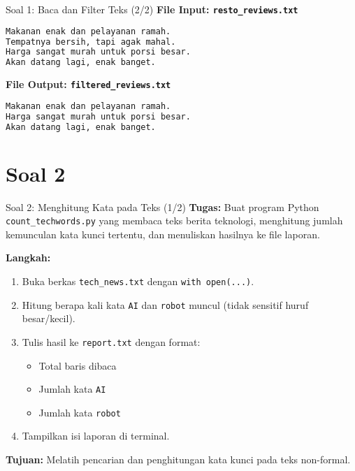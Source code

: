 \documentclass[aspectratio=169, table]{beamer}
\begin{document}
\begin{frame}[fragile]{Soal 1: Baca dan Filter Teks (2/2)}
\vspace{15pt}
\textbf{File Input: \texttt{resto\_reviews.txt}}
\begin{lstlisting}[language=bash,basicstyle=\ttfamily\small]
Makanan enak dan pelayanan ramah.
Tempatnya bersih, tapi agak mahal.
Harga sangat murah untuk porsi besar.
Akan datang lagi, enak banget.
\end{lstlisting}

\textbf{File Output: \texttt{filtered\_reviews.txt}}
\begin{lstlisting}[language=bash,basicstyle=\ttfamily\small]
Makanan enak dan pelayanan ramah.
Harga sangat murah untuk porsi besar.
Akan datang lagi, enak banget.
\end{lstlisting}
\end{frame}

\section{Soal 2}
\begin{frame}[fragile]{Soal 2: Menghitung Kata pada Teks (1/2)}
\vspace{15pt}
\textbf{Tugas:}  
Buat program Python \texttt{count\_techwords.py} yang membaca teks berita teknologi, menghitung jumlah kemunculan kata kunci tertentu, dan menuliskan hasilnya ke file laporan.

\textbf{Langkah:}
\begin{enumerate}
  \item Buka berkas \texttt{tech\_news.txt} dengan \texttt{with open(...)}.
  \item Hitung berapa kali kata \texttt{AI} dan \texttt{robot} muncul  
        (tidak sensitif huruf besar/kecil).
  \item Tulis hasil ke \texttt{report.txt} dengan format:
        \begin{itemize}
          \item Total baris dibaca
          \item Jumlah kata \texttt{AI}
          \item Jumlah kata \texttt{robot}
        \end{itemize}
  \item Tampilkan isi laporan di terminal.
\end{enumerate}
\textbf{Tujuan:}  
Melatih pencarian dan penghitungan kata kunci pada teks non-formal.
\end{frame}
\end{document}
